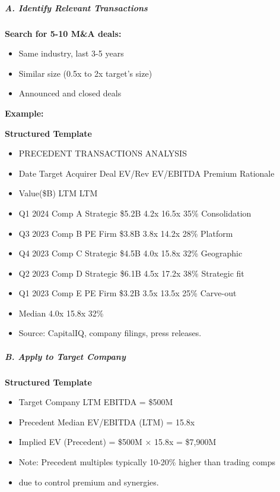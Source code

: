 \documentclass[11pt]{article}
\begin{document}
\subparagraph{A. Identify Relevant Transactions}\mbox{}\par

\textbf{Search for 5-10 M\&A deals:}

\begin{itemize}[leftmargin=*,itemsep=2pt,topsep=2pt]
\item {} Same industry, last 3-5 years
\item {} Similar size (0.5x to 2x target's size)
\item {} Announced and closed deals
\end{itemize}

\textbf{Example:}

\textbf{Structured Template}
\begin{itemize}[leftmargin=*,itemsep=2pt,topsep=2pt]
\item {} PRECEDENT TRANSACTIONS ANALYSIS
\item {} Date Target Acquirer Deal EV/Rev EV/EBITDA Premium Rationale
\item {} Value(\$B) LTM LTM
\item {} Q1 2024 Comp A Strategic \$5.2B 4.2x 16.5x 35\% Consolidation
\item {} Q3 2023 Comp B PE Firm \$3.8B 3.8x 14.2x 28\% Platform
\item {} Q4 2023 Comp C Strategic \$4.5B 4.0x 15.8x 32\% Geographic
\item {} Q2 2023 Comp D Strategic \$6.1B 4.5x 17.2x 38\% Strategic fit
\item {} Q1 2023 Comp E PE Firm \$3.2B 3.5x 13.5x 25\% Carve-out
\item {} Median 4.0x 15.8x 32\%
\item {} Source: CapitalIQ, company filings, press releases.
\end{itemize}

\subparagraph{B. Apply to Target Company}\mbox{}\par

\textbf{Structured Template}
\begin{itemize}[leftmargin=*,itemsep=2pt,topsep=2pt]
\item {} Target Company LTM EBITDA = \$500M
\item {} Precedent Median EV/EBITDA (LTM) = 15.8x
\item {} Implied EV (Precedent) = \$500M × 15.8x = \$7,900M
\item {} Note: Precedent multiples typically 10-20\% higher than trading comps
\item {} due to control premium and synergies.
\end{itemize}
\end{document}
